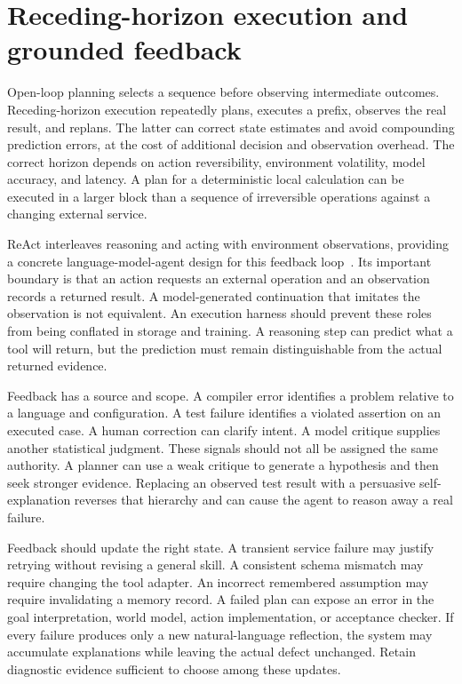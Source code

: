 \section{Receding-horizon execution and grounded feedback}
\label{sec:C10:feedback}
Open-loop planning selects a sequence before observing intermediate outcomes. Receding-horizon execution repeatedly plans, executes a prefix, observes the real result, and replans. The latter can correct state estimates and avoid compounding prediction errors, at the cost of additional decision and observation overhead. The correct horizon depends on action reversibility, environment volatility, model accuracy, and latency. A plan for a deterministic local calculation can be executed in a larger block than a sequence of irreversible operations against a changing external service.

ReAct interleaves reasoning and acting with environment observations, providing a concrete language-model-agent design for this feedback loop~\cite{yao2022react}. Its important boundary is that an action requests an external operation and an observation records a returned result. A model-generated continuation that imitates the observation is not equivalent. An execution harness should prevent these roles from being conflated in storage and training. A reasoning step can predict what a tool will return, but the prediction must remain distinguishable from the actual returned evidence.

Feedback has a source and scope. A compiler error identifies a problem relative to a language and configuration. A test failure identifies a violated assertion on an executed case. A human correction can clarify intent. A model critique supplies another statistical judgment. These signals should not all be assigned the same authority. A planner can use a weak critique to generate a hypothesis and then seek stronger evidence. Replacing an observed test result with a persuasive self-explanation reverses that hierarchy and can cause the agent to reason away a real failure.

Feedback should update the right state. A transient service failure may justify retrying without revising a general skill. A consistent schema mismatch may require changing the tool adapter. An incorrect remembered assumption may require invalidating a memory record. A failed plan can expose an error in the goal interpretation, world model, action implementation, or acceptance checker. If every failure produces only a new natural-language reflection, the system may accumulate explanations while leaving the actual defect unchanged. Retain diagnostic evidence sufficient to choose among these updates.

